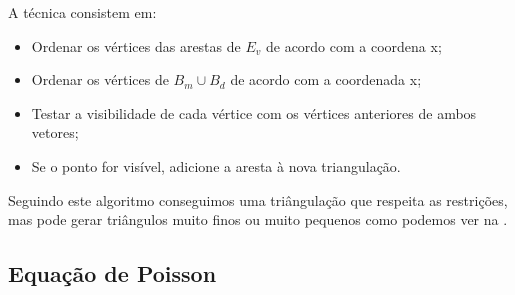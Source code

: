A técnica consistem em:
\begin{itemize}
 \item{Ordenar os vértices das arestas de $E_v$ de acordo com a coordena x;}
 \item{Ordenar os vértices de $B_m \cup B_d$ de acordo com a coordenada x;}
 \item{Testar a visibilidade de cada vértice com os vértices anteriores de ambos vetores;}
 \item{Se o ponto for visível, adicione a aresta à nova triangulação.}
\end{itemize}

Seguindo este algoritmo conseguimos uma triângulação que respeita as restrições, mas pode gerar triângulos muito
finos ou muito pequenos como podemos ver na .


\subsection{Equação de Poisson}

